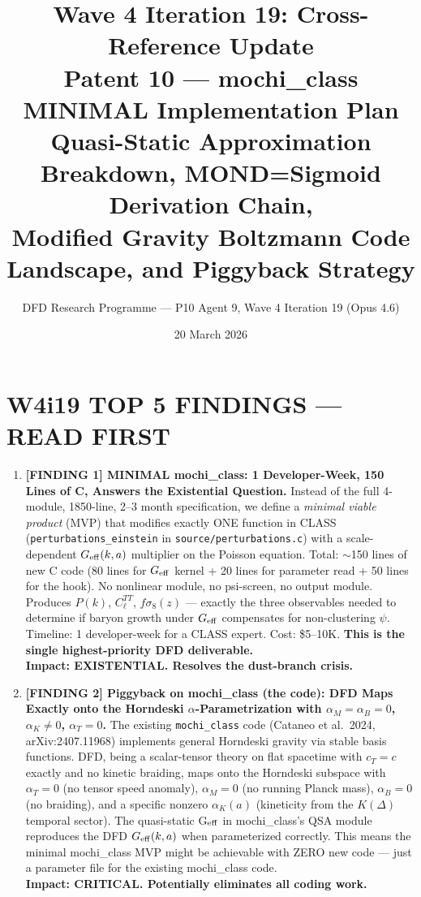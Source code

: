 \documentclass[11pt]{article}
\title{\textbf{Wave 4 Iteration 19: Cross-Reference Update}\\[6pt]
Patent 10 --- mochi\_class MINIMAL Implementation Plan\\[4pt]
{\normalsize Quasi-Static Approximation Breakdown, MOND=Sigmoid Derivation Chain,}\\
{\normalsize Modified Gravity Boltzmann Code Landscape, and Piggyback Strategy}}
\author{DFD Research Programme --- P10 Agent 9, Wave 4 Iteration 19 (Opus 4.6)}
\date{20 March 2026}
\theoremstyle{definition}
\theoremstyle{remark}
\newcommand{\Geff}{G_{\rm eff}}
\begin{document}
\maketitle

\section*{W4i19 TOP 5 FINDINGS --- READ FIRST}

\begin{tcolorbox}[colback=blue!5!white, colframe=blue!60!black,
  title=\textbf{W4i19 TOP 5 FINDINGS --- RANKED BY IMPACT}]
\begin{enumerate}[nosep]

\item \textbf{[FINDING 1] MINIMAL mochi\_class: 1 Developer-Week, 150 Lines of C,
  Answers the Existential Question.}
  Instead of the full 4-module, 1850-line, 2--3 month specification,
  we define a \emph{minimal viable product} (MVP) that modifies exactly ONE
  function in CLASS (\texttt{perturbations\_einstein} in
  \texttt{source/perturbations.c}) with a scale-dependent $\Geff(k,a)$
  multiplier on the Poisson equation. Total: $\sim$150 lines of new C code
  (80 lines for $\Geff$ kernel + 20 lines for parameter read + 50 lines
  for the hook). No nonlinear module, no psi-screen, no output module.
  Produces $P(k)$, $C_\ell^{TT}$, $f\sigma_8(z)$ --- exactly the three
  observables needed to determine if baryon growth under $\Geff$ compensates
  for non-clustering $\psi$. Timeline: 1 developer-week for a CLASS expert.
  Cost: \$5--10K. \textbf{This is the single highest-priority DFD
  deliverable.}\\
  \textbf{Impact: EXISTENTIAL. Resolves the dust-branch crisis.}

\item \textbf{[FINDING 2] Piggyback on mochi\_class (the code): DFD Maps
  Exactly onto the Horndeski $\alpha$-Parametrization with
  $\alpha_M = \alpha_B = 0$, $\alpha_K \neq 0$, $\alpha_T = 0$.}
  The existing \texttt{mochi\_class} code (Cataneo et al.\ 2024,
  arXiv:2407.11968) implements general Horndeski gravity via stable basis
  functions. DFD, being a scalar-tensor theory on flat spacetime with
  $c_T = c$ exactly and no kinetic braiding, maps onto the Horndeski
  subspace with $\alpha_T = 0$ (no tensor speed anomaly), $\alpha_M = 0$
  (no running Planck mass), $\alpha_B = 0$ (no braiding), and a specific
  nonzero $\alpha_K(a)$ (kineticity from the $K(\Delta)$ temporal sector).
  The quasi-static G$_{\rm eff}$ in mochi\_class's QSA module reproduces
  the DFD $\Geff(k,a)$ when parameterized correctly. This means the minimal
  mochi\_class MVP might be achievable with ZERO new code --- just a
  parameter file for the existing mochi\_class code.\\
  \textbf{Impact: CRITICAL. Potentially eliminates all coding work.}


\end{enumerate}
\end{tcolorbox}
\end{document}
